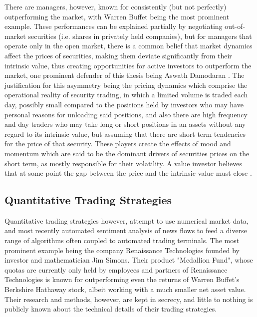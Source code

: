 \documentclass[conference]{IEEEtran}
\begin{document}
There are managers, however, known for consistently (but not perfectly) outperforming the market, with Warren Buffet being the most prominent example. These performances can be explained partially by negotiating out-of-market securities (i.e. shares in privately held companies), but for managers that operate only in the open market, there is a common belief that market dynamics affect the prices of securities, making them deviate significantly from their intrinsic value, thus creating opportunities for active investors to outperform the market, one prominent defender of this thesis being Aswath Damodaran \cite{damodaran2012investment}. The justification for this asymmetry being the pricing dynamics which comprise the operational reality of security trading, in which a limited volume is traded each day, possibly small compared to the positions held by investors who may have personal reasons for unloading said positions, and also there are high frequency and day traders who may take long or short positions in an assets without any regard to its intrinsic value, but assuming that there are short term tendencies for the price of that security. These players create the effects of mood and momentum which are said to be the dominant drivers of securities prices on the short term, as mostly responsible for their volatility. A value investor believes that at some point the gap between the price and the intrinsic value must close \cite{damodaran2015valuation}. 

\subsection{Quantitative Trading Strategies}

Quantitative trading strategies however, attempt to use numerical market data, and most recently automated sentiment analysis of news flows to feed a diverse range of algorithms often coupled to automated trading terminals. The most prominent example being the company Renaissance Technologies founded by investor and mathematician Jim Simons. Their product "Medallion Fund", whose quotas are currently only held by employees and partners of Renaissance Technologies is known for outperforming even the returns of Warren Buffet's Berkshire Hathaway stock, albeit working with a much smaller net asset value. Their research and methods, however, are kept in secrecy, and little to nothing is publicly known about the technical details of their trading strategies.
\end{document}
